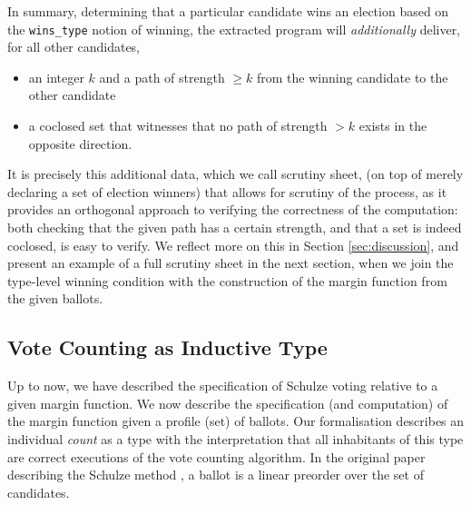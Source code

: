 \label{sec:evidence}
In summary, determining that a particular candidate wins an election
based on the \texttt{wins\_type} notion of winning, the extracted
program will \emph{additionally} deliver, for all other candidates,
\begin{itemize}
\item an integer $k$ and a path of strength $\geq k$ from the winning candidate to the
other candidate 
\item a coclosed set that witnesses that no path of strength $>k$
exists in the opposite direction.
\end{itemize}

\noindent
It is precisely this additional data, which we call scrutiny sheet,
(on top of merely declaring a set of
election winners) that allows for scrutiny of the process, as it
provides an orthogonal approach to verifying the correctness of the
computation: both checking that the given path has a certain
strength, and that a set is indeed coclosed, is easy to verify.
We reflect more on this in Section
\ref{sec:discussion}, and present an example of a full scrutiny
sheet in the next section, when we join the type-level winning
condition with the construction of the margin function from the
given ballots. 

\subsection{Vote Counting as Inductive Type}
\label{sec:inductive_type}
Up to now, we have described the specification of Schulze voting
relative to a given margin function. We now describe the
specification (and computation) of the margin function given a
profile (set) of ballots.  Our formalisation describes an individual
\emph{count} as a type with the interpretation that all inhabitants
of this type are correct executions of the vote counting algorithm.
In the original paper describing the
Schulze method \citep{Schulze:2011:NMC}, a ballot is a linear
preorder over the set of candidates.


